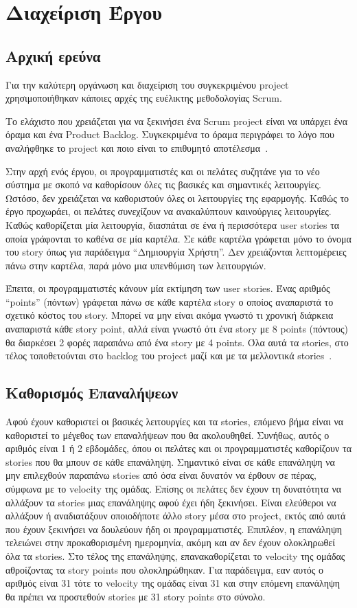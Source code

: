\documentclass[oneside, 12pt]{book}
\begin{document}
\chapter{Διαχείριση Έργου}
\section{Αρχική ερεύνα}
Για την καλύτερη οργάνωση και διαχείριση του συγκεκριμένου project χρησιμοποιήθηκαν κάποιες αρχές της ευέλικτης μεθοδολογίας Scrum.

Το ελάχιστο που χρειάζεται για να ξεκινήσει ένα Scrum project είναι να 
υπάρχει ένα όραμα και ένα Product Backlog.
Συγκεκριμένα το όραμα περιγράφει το λόγο που αναλήφθηκε το project και ποιο είναι το επιθυμητό αποτέλεσμα~\cite{schwaber2004agile}.

Στην αρχή ενός έργου, οι προγραμματιστές και οι πελάτες συζητάνε 
για το νέο σύστημα με σκοπό να καθορίσουν όλες τις βασικές και 
σημαντικές λειτουργίες. 
Ωστόσο, δεν χρειάζεται να καθοριστούν όλες οι λειτουργίες της 
εφαρμογής. Καθώς το έργο προχωράει, οι πελάτες συνεχίζουν να 
ανακαλύπτουν καινούργιες λειτουργίες.
Καθώς καθορίζεται μία λειτουργία, διασπάται σε ένα ή περισσότερα user stories τα οποία γράφονται το καθένα σε μία 
καρτέλα. Σε κάθε καρτέλα γράφεται μόνο το όνομα του story όπως για 
παράδειγμα ``Δημιουργία Χρήστη''. Δεν χρειάζονται λεπτομέρειες πάνω στην 
καρτέλα, παρά μόνο μια υπενθύμιση των λειτουργιών.

Έπειτα, οι προγραμματιστές κάνουν μία εκτίμηση των user stories. 
Ένας αριθμός ``points'' (πόντων) γράφεται πάνω σε κάθε καρτέλα story 
ο οποίος αναπαριστά το σχετικό κόστος του story. Μπορεί να μην 
είναι ακόμα γνωστό τι χρονική διάρκεια αναπαριστά κάθε story point, 
αλλά είναι γνωστό ότι ένα story με 8 points (πόντους) θα διαρκέσει 
2 φορές παραπάνω από ένα story με 4 points.
Όλα αυτά τα stories, στο τέλος τοποθετούνται στο backlog του project μαζί και με τα μελλοντικά stories~\cite[Chapter~3]{AgilePrinciplesC}.

\section{Καθορισμός Επαναλήψεων}
Αφού έχουν καθοριστεί οι βασικές λειτουργίες και τα stories, επόμενο βήμα είναι να καθοριστεί το μέγεθος των επαναλήψεων που θα ακολουθηθεί.
Συνήθως, αυτός ο αριθμός είναι 1 ή 2 εβδομάδες, όπου οι πελάτες και οι 
προγραμματιστές καθορίζουν τα stories που θα μπουν σε κάθε επανάληψη.
Σημαντικό είναι σε κάθε επανάληψη να μην επιλεχθούν παραπάνω stories 
από όσα είναι δυνατόν να έρθουν σε πέρας, σύμφωνα με το velocity της 
ομάδας.
Επίσης οι πελάτες δεν έχουν τη δυνατότητα να αλλάξουν τα stories μιας 
επανάληψης αφού έχει ήδη ξεκινήσει.
Είναι ελεύθεροι να αλλάξουν ή αναδιατάξουν οποιοδήποτε άλλο story μέσα 
στο project, εκτός από αυτά που έχουν ξεκινήσει να δουλεύουν ήδη οι 
προγραμματιστές.
Επιπλέον, η επανάληψη τελειώνει στην προκαθορισμένη ημερομηνία, ακόμη 
και αν δεν έχουν ολοκληρωθεί όλα τα stories.
Στο τέλος της επανάληψης, επανακαθορίζεται το velocity της ομάδας 
αθροίζοντας τα story points που ολοκληρώθηκαν. Για παράδειγμα, εαν 
αυτός ο αριθμός είναι 31 τότε το velocity της ομάδας είναι 31 και στην 
επόμενη επανάληψη θα πρέπει να προστεθούν stories με 31 story points 
στο σύνολο.
\cite[Chapter~3]{AgilePrinciplesC}
\end{document}
